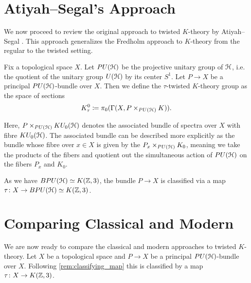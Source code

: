 \documentclass[10pt]{amsart}
\begin{document}
\section{Atiyah--Segal's Approach}
We now proceed to review the original approach to twisted $K$-theory by Atiyah--Segal \cite{atiyahsegal2004twistedktheory}. This approach generalizes the Fredholm approach to $K$-theory from the regular to the twisted setting. 

\begin{definition} \label{def:twisted_K_theory_atiyah}
 Fix a topological space $X$. Let $PU(\mathcal{H})$ be the projective unitary group of $\mathcal{H}$, i.e. the quotient of the unitary group $U(\mathcal{H})$ by its center $S^1$. Let $P \to X$ be a principal $PU(\mathcal{H})$-bundle over $X$. Then we define the $\tau$-twisted $K$-theory group as the space of sections
	\[K^0_\tau \coloneq \pi_0(\Gamma(X,P \times_{PU(\mathcal{H})} K)). \]
\end{definition}

\begin{remark}
	Here, $P \times_{PU(\mathcal{H})} KU_0(\mathcal{H})$ denotes the associated bundle of spectra over $X$ with fibre $KU_0(\mathcal{H})$. The associated bundle can be described more explicitly as the bundle whose fibre over $x \in X$ is given by the $P_x \times_{PU(\mathcal{H})} K_0$, meaning we take the products of the fibers and quotient out the simultaneous action of $PU(\mathcal{H})$ on the fibers $P_x$ and $K_0$.
\end{remark}

\begin{remark} \label{rem:classifying_map}
	As we have $BPU(\mathcal{H}) \simeq K(\mathbb{Z},3)$, the bundle $P \to X$ is classified via a map $\tau \colon X \to BPU(\mathcal{H}) \simeq K(\mathbb{Z},3)$.
\end{remark}
 

\section{Comparing Classical and Modern}
We are now ready to compare the classical and modern approaches to twisted $K$-theory. Let $X$ be a topological space and $P \to X$ be a principal $PU(\mathcal{H})$-bundle over $X$. Following \cref{rem:classifying_map} this is classified by a map $\tau \colon X \to K(\mathbb{Z},3)$. 
\end{document}
